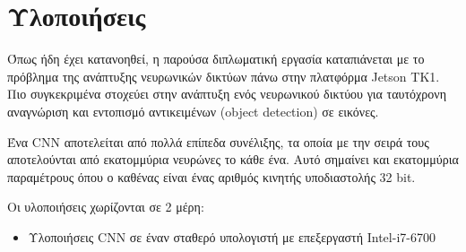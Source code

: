\chapter{Υλοποιήσεις}
\label{chapter:implementations}

Όπως ήδη έχει κατανοηθεί, η παρούσα διπλωματική εργασία καταπιάνεται με το
πρόβλημα της ανάπτυξης νευρωνικών δικτύων πάνω στην πλατφόρμα Jetson TK1.
Πιο συγκεκριμένα στοχεύει στην ανάπτυξη ενός νευρωνικού δικτύου για ταυτόχρονη
αναγνώριση και εντοπισμό αντικειμένων (object detection) σε εικόνες.

Ένα CNN αποτελείται από πολλά επίπεδα συνέλιξης, τα οποία με την σειρά τους
αποτελούνται από εκατομμύρια νευρώνες το κάθε ένα. Αυτό σημαίνει και εκατομμύρια
παραμέτρους όπου ο καθένας είναι ένας αριθμός κινητής υποδιαστολής 32 bit.

Οι υλοποιήσεις χωρίζονται σε 2 μέρη:
\begin{itemize}
  \item{Υλοποιήσεις CNN σε έναν σταθερό υπολογιστή με επεξεργαστή Intel-i7-6700}
\end{itemize}







